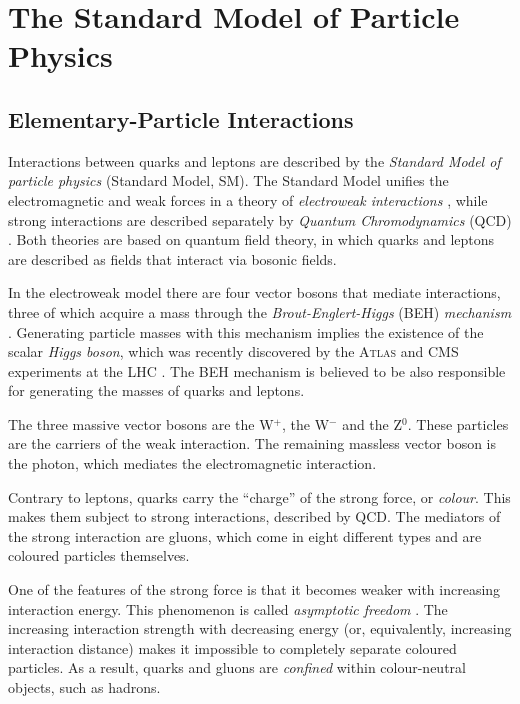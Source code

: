 \section{The Standard Model of Particle Physics}
\label{sec:intro_SM}

\subsection{Elementary-Particle Interactions}
\label{subsec:intro_SM_int}

Interactions between quarks and leptons are described by the \emph{Standard Model of particle physics} (Standard Model, SM). The Standard
Model unifies the electromagnetic and weak forces in a theory of \emph{electroweak interactions}
\cite{Glashow:1961tr,*Weinberg:1967tq,*Salam:1968rm}, while strong interactions are described separately by \emph{Quantum Chromodynamics}
(QCD) \cite{Fritzsch:1973pi}. Both theories are based on quantum field theory, in which quarks and leptons are described as fields that
interact via bosonic fields.

In the electroweak model there are four vector bosons that mediate interactions, three of which acquire a mass through the
\emph{Brout-Englert-Higgs} (BEH) \emph{mechanism} \cite{Englert:1964et,*Higgs:1964ia,*Higgs:1964pj,*Guralnik:1964eu}. Generating particle
masses with this mechanism implies the existence of the scalar \emph{Higgs boson}, which was recently discovered by the \textsc{Atlas} and
CMS experiments at the LHC \cite{Aad:2012tfa,*Chatrchyan:2012ufa}. The BEH mechanism is believed to be also responsible for generating the
masses of quarks and leptons.

The three massive vector bosons are the W$^+$, the W$^-$ and the Z$^0$. These particles are the carriers of the weak interaction. The
remaining massless vector boson is the photon, which mediates the electromagnetic interaction.

Contrary to leptons, quarks carry the ``charge'' of the strong force, or \emph{colour}. This makes them subject to strong interactions,
described by QCD. The mediators of the strong interaction are gluons, which come in eight different types and are coloured particles
themselves.

One of the features of the strong force is that it becomes weaker with increasing interaction energy. This phenomenon is called
\emph{asymptotic freedom} \cite{Gross:1973id,*Politzer:1973fx}. The increasing interaction strength with decreasing energy (or,
equivalently, increasing interaction distance) makes it impossible to completely separate coloured particles. As a result, quarks and
gluons are \emph{confined} within colour-neutral objects, such as hadrons.

